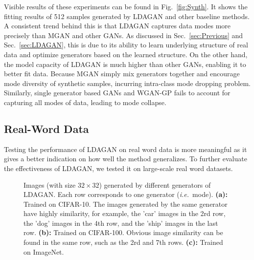 \documentclass{article}
\def\ie{\emph{i.e.}}
\begin{document}
Visible results of these experiments can be found in Fig.~\ref{fig:Synth}.
It shows the fitting results of 512 samples generated by LDAGAN and other baseline methods.
A consistent trend behind this is that LDAGAN captures data modes more precisely than MGAN and other GANs.
As discussed in Sec.~\ref{sec:Previous} and Sec.~\ref{sec:LDAGAN}, this is due to its ability to learn underlying structure of real data and optimize generators based on the learned structure.
On the other hand, the model capacity of LDAGAN is much higher than other GANs, enabling it to better fit data.
Because MGAN simply mix generators together and encourage mode diversity of synthetic samples, incurring intra-class mode dropping problem.
Similarly, single generator based GANs and WGAN-GP fails to account for capturing all modes of data, leading to mode collapse.


\subsection{Real-Word Data}

Testing the performance of LDAGAN on real word data is more meaningful as it gives a better indication on how well the method generalizes.
To further evaluate the effectiveness of LDAGAN, we tested it on large-scale real word datasets.

\begin{figure*}
  \centering
    \hspace{.15in}
    \hspace{.15in}
     \caption{Images (with size $32\times32$) generated by different generators of LDAGAN. Each row corresponds to one generator (\ie~mode). \textbf{(a):} Trained on CIFAR-10. The images generated by the same generator have highly similarity, for example, the 'car' images in the 2rd row, the 'dog' images in the 4th row, and the 'ship' images in the last row.  \textbf{(b):} Trained on CIFAR-100. Obvious image similarity can be found in the same row, such as the 2rd and 7th rows. \textbf{(c):} Trained on ImageNet.}
     \label{fig:Struc}
\end{figure*}

\end{document}
